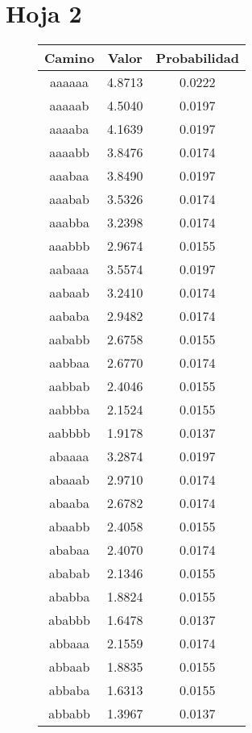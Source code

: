 \section{Hoja 2}

\begin{figure}[hbpt]
\begin{minipage}{0.48\textwidth}
\begin{center}
\begin{tabular}{|c|c|c|}
\hline
\textbf{Camino} & \textbf{Valor} & \textbf{Probabilidad} \\
\hline
aaaaaa  &  4.8713  &  0.0222  \\
aaaaab  &  4.5040  &  0.0197  \\
aaaaba  &  4.1639  &  0.0197  \\
aaaabb  &  3.8476  &  0.0174  \\
aaabaa  &  3.8490  &  0.0197  \\
aaabab  &  3.5326  &  0.0174  \\
aaabba  &  3.2398  &  0.0174  \\
aaabbb  &  2.9674  &  0.0155  \\
aabaaa  &  3.5574  &  0.0197  \\
aabaab  &  3.2410  &  0.0174  \\
aababa  &  2.9482  &  0.0174  \\
aababb  &  2.6758  &  0.0155  \\
aabbaa  &  2.6770  &  0.0174  \\
aabbab  &  2.4046  &  0.0155  \\
aabbba  &  2.1524  &  0.0155  \\
aabbbb  &  1.9178  &  0.0137  \\
abaaaa  &  3.2874  &  0.0197  \\
abaaab  &  2.9710  &  0.0174  \\
abaaba  &  2.6782  &  0.0174  \\
abaabb  &  2.4058  &  0.0155  \\
ababaa  &  2.4070  &  0.0174  \\
ababab  &  2.1346  &  0.0155  \\
ababba  &  1.8824  &  0.0155  \\
ababbb  &  1.6478  &  0.0137  \\
abbaaa  &  2.1559  &  0.0174  \\
abbaab  &  1.8835  &  0.0155  \\
abbaba  &  1.6313  &  0.0155  \\
abbabb  &  1.3967  &  0.0137  \\

\end{tabular}
\end{center}
\end{minipage}
\end{figure}

